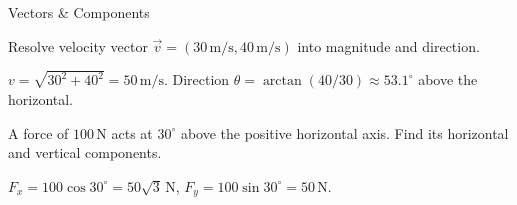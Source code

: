 \begin{KnowledgePoint}{Vectors \& Components \Core}
  \KPProblems
\begin{cheatproblem}
  Resolve velocity vector $\vec v=(30\,\text{m/s},40\,\text{m/s})$ into magnitude and direction.
\begin{solutionbox}
  $v=\sqrt{30^2+40^2}=50\,\text{m/s}$. Direction $\theta=\arctan(40/30)\approx53.1^\circ$ above the horizontal.
\end{solutionbox}
\end{cheatproblem}
\begin{cheatproblem}
  A force of $100\,\text{N}$ acts at $30^\circ$ above the positive horizontal axis. Find its horizontal and vertical components.
\begin{solutionbox}
  $F_x=100\cos30^\circ=50\sqrt3\,\text{N}$, $F_y=100\sin30^\circ=50\,\text{N}$.
\end{solutionbox}
\end{cheatproblem}
\end{KnowledgePoint}

